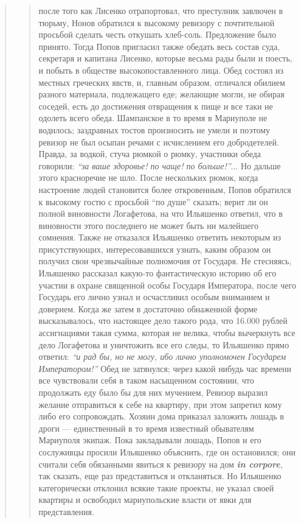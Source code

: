 \begin{quote}
\begin{quote}
после того как Лисенко отрапортовал, что престулник
завлючен в тюрьму, Нонов обратился к высокому ревизору с почтительной 
просьбой сделать честь откушать хлеб-соль. Предложение было принято. 
Тогда Попов пригласил
также обедать весь состав суда, секретаря и капитана
Лисенко, которые весьма рады были и поесть, и побыть в
обществе высокопоставленного лица. Обед состоял из местных греческих явств, и, главным образом, отличался
обилием разного материала, подлежащего еде; желающие
могли, не обирая соседей, есть до достижения отвращения к
пище и все таки не одолеть всего обеда. Шампанское в
то время в Мариуполе не водилось; заздравных тостов
произносить не умели и поэтому ревизор не был осыпан
речами с исчислением его добродетелей. Правда, за водкой,
стуча рюмкой о рюмку, участники обеда говорили: \emph{``за ваше
здоровье! по чаще! по больше!''}... Но дальше этого красноречие не шло.
После нескольких рюмок, когда настроение людей становится более откровенным, Попов обратился к
высокому гостю с просьбой ``по душе'' сказать; верит ли
он полной виновности Логафетова, на что Ильяшенко ответил, что в виновности этого последнего
не может быть ни малейшего сомнения. Также не отказался Ильяшенко ответить некоторым из 
присутствующих, интересовавшихся узнать, каким образом он получил свои чрезвычайные
полномочия от Государя. Не стесняясь, Ильяшенко рассказал 
какую-то фантастическую историю об его участии в
охране священной особы Государя Императора, после чего
Государь его лично узнал и осчастливил особым вниманием и доверием.
Когда же затем в достаточно обнаженной форме высказывалось, что настоящее дело такого рода,
что 16.000 рублей ассигнациями такая сумма, которая не
велика, чтобы вычеркнуть все дело Логафетова и уничтожить
все его следы, то Ильяшенко прямо ответил: \emph{``и рад бы,
но не могу, ибо лично уполномочен Государем Императором!''} Обед не затянулся; через какой нибудь час
времени все чувствовали себя в таком насыщенном состоянии,
что продолжать еду было бы для них мучением,
Ревизор выразил желание отправиться к себе на квартиру,
при этом запретил кому либо его сопровождать. Хозяин
дома приказал заложить лошадь в дроги — единственный
в то время известный обывателям Мариуполя экипаж.
Пока закладывали лошадь, Попов и его сослуживцы просили Ильяшенко 
объяснить, где он остановился; они считали себя обязанными явиться к ревизору на дом \textbf{\em in corpore},
так сказать, еще раз представиться и откланяться. Но
Ильяшенко категорически отклонил всякие такие проекты,
не указал своей квартиры и освободил мариупольские власти
от явки для представления.


\end{quote}
\end{quote}
